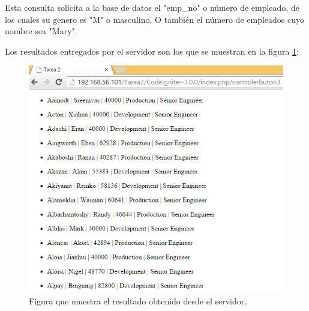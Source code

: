 Esta consulta solicita a la base de datos el "emp\_no" o número de empleado, de los cuales su genero es "M" o masculino, O también el número de empleados cuyo nombre sea "Mary".

Los resultados entregados por el servidor son los que se muestran en la figura \ref{Figura7}:

\begin{figure}[htb]
	\label{Figura7}
	\begin{center}
		\includegraphics[scale=0.7]{imagenes/resultado3.png}
		\caption{Figura que muestra el resultado obtenido desde el servidor.}
	\end{center}
\end{figure}


 

